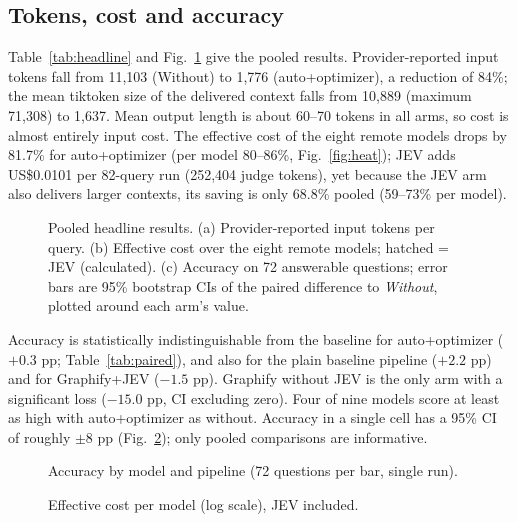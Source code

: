 \documentclass[conference,onecolumn,11pt]{IEEEtran}
\begin{document}
\subsection{Tokens, cost and accuracy}
Table~\ref{tab:headline} and Fig.~\ref{fig:headline} give the pooled results. Provider-reported input tokens fall from 11,103 (Without) to 1,776 (auto+optimizer), a reduction of 84\%; the mean tiktoken size of the delivered context falls from 10,889 (maximum 71,308) to 1,637. Mean output length is about 60--70 tokens in all arms, so cost is almost entirely input cost. The effective cost of the eight remote models drops by 81.7\% for auto+optimizer (per model 80--86\%, Fig.~\ref{fig:heat}); JEV adds US\$0.0101 per 82-query run (252,404 judge tokens), yet because the JEV arm also delivers larger contexts, its saving is only 68.8\% pooled (59--73\% per model).




\begin{figure}[!htbp]\centering
{}
\caption{Pooled headline results. (a) Provider-reported input tokens per query. (b) Effective cost over the eight remote models; hatched = JEV (calculated). (c) Accuracy on 72 answerable questions; error bars are 95\% bootstrap CIs of the paired difference to \emph{Without}, plotted around each arm's value.}\label{fig:headline}
\end{figure}

Accuracy is statistically indistinguishable from the baseline for auto+optimizer ($+0.3$ pp; Table~\ref{tab:paired}), and also for the plain baseline pipeline ($+2.2$ pp) and for Graphify+JEV ($-1.5$ pp). Graphify without JEV is the only arm with a significant loss ($-15.0$ pp, CI excluding zero). Four of nine models score at least as high with auto+optimizer as without. Accuracy in a single cell has a 95\% CI of roughly $\pm 8$ pp (Fig.~\ref{fig:accmodel}); only pooled comparisons are informative.



\begin{figure}[!htbp]\centering
{}
\caption{Accuracy by model and pipeline (72 questions per bar, single run).}\label{fig:accmodel}
\end{figure}

\begin{figure}[!htbp]\centering
{}
\caption{Effective cost per model (log scale), JEV included.}\label{fig:costmodel}
\end{figure}
\end{document}
